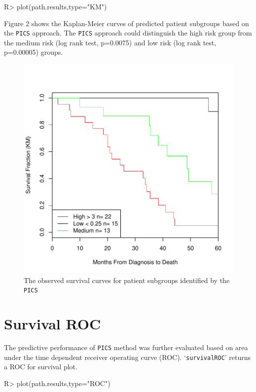 \documentclass[11pt]{article}
\begin{document}
\begin{Schunk}
\begin{Sinput}
R> plot(path.results,type="KM")
\end{Sinput}
\end{Schunk}

Figure 2 shows the Kaplan-Meier curves of predicted patient subgroups based on the \texttt{PICS} approach. The \texttt{PICS} approach could distinguish the high risk group from the medium risk (log rank test, p=0.0075) and low risk (log rank test, p=0.00005) groups.

\begin{figure}[tbh]
\begin{center}
\includegraphics{PICS-example-plot}
\caption{The observed survival curves for patient subgroups identified by the \texttt{PICS}}
\end{center}
\end{figure}

\section{Survival ROC}

The predictive performance of \texttt{PICS} method was further evaluated based on area under the time dependent receiver operating curve (ROC).
`\texttt{survivalROC}' returns a ROC for survival plot.
\begin{Schunk}
\begin{Sinput}
R> plot(path.results,type="ROC")
\end{Sinput}
\end{Schunk}
\end{document}
